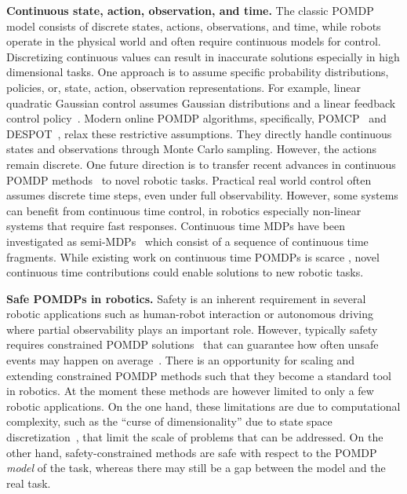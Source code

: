 \documentclass[journal]{IEEEtran}
\begin{document}
\textbf{Continuous state, action, observation, and time.}
The classic POMDP model consists of discrete states, actions, observations, and time, while robots operate in the physical world and often require continuous models for control.
%
Discretizing continuous values can
result in inaccurate solutions especially in high dimensional
tasks. One approach is to assume specific probability distributions,
policies, or, state, action, observation representations. For example,
linear quadratic Gaussian control assumes Gaussian distributions and a
linear feedback control policy~\cite{van2012efficient}.
Modern online POMDP algorithms, specifically, POMCP~\cite{silver2010monte} and DESPOT~\cite{somani2013despot}, relax these restrictive assumptions. They directly handle continuous states and observations through Monte Carlo sampling. However, the actions remain discrete.
One future direction
is to transfer recent advances in
continuous POMDP methods~\cite{sunberg2018online} to novel robotic
tasks.
%
%
%
Practical real world control often assumes
discrete time steps, even under full observability. However, some
systems can benefit from continuous time control, in robotics especially
non-linear systems that require fast responses. Continuous time MDPs have been
investigated as semi-MDPs~\cite{sutton1999between} which
consist of a sequence of continuous time fragments.
While existing work on continuous time POMDPs is scarce \cite{chaudhari2013sampling},
novel continuous time contributions
could enable solutions to new {robotic tasks}.

\textbf{Safe POMDPs in robotics.} Safety is an inherent requirement in
several robotic applications {such as human-robot interaction or autonomous
driving} where partial observability plays an important role. However, typically safety requires constrained POMDP
solutions~\cite{thiebaux2016rao,lee2018monte} that can guarantee how
often unsafe events may happen on
average~\cite{charnes1963deterministic,undurti2010online,thiebaux2016rao,lee2018monte}.
{There is an opportunity for scaling and extending constrained POMDP methods
such that they become a standard tool in robotics.}
At
the moment these methods are however limited to {only a} few robotic
applications.
{On the one hand, these limitations are due to computational complexity, such as the ``curse of dimensionality'' due to state space discretization~\cite{wang2018bounded}, that limit the scale of problems that can be addressed.
On the other hand, safety-constrained methods are safe with respect to the POMDP \emph{model} of the task, whereas there may still be a gap between the model and the real task.}
\end{document}
